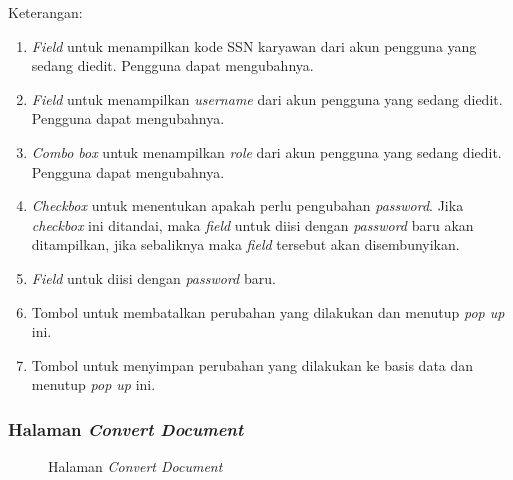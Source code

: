 Keterangan:
\begin{enumerate}
	\item \textit{Field} untuk menampilkan kode SSN karyawan dari akun pengguna yang sedang diedit. Pengguna dapat mengubahnya.
	\item \textit{Field} untuk menampilkan \textit{username} dari akun pengguna yang sedang diedit. Pengguna dapat mengubahnya.
	\item \textit{Combo box} untuk menampilkan \textit{role} dari akun pengguna yang sedang diedit. Pengguna dapat mengubahnya.
	\item \textit{Checkbox} untuk menentukan apakah perlu pengubahan \textit{password}. Jika \textit{checkbox} ini ditandai, maka \textit{field} untuk diisi dengan \textit{password} baru akan ditampilkan, jika sebaliknya maka \textit{field} tersebut akan disembunyikan.
	\item \textit{Field} untuk diisi dengan \textit{password} baru.
	\item Tombol untuk membatalkan perubahan yang dilakukan dan menutup \textit{pop up} ini. 
	\item Tombol untuk menyimpan perubahan yang dilakukan ke basis data dan menutup \textit{pop up} ini. 
\end{enumerate}


\subsubsection{Halaman \textit{Convert Document}}
\label{sec:page6}

\begin{figure}[H]
	\centering
	\caption{Halaman \textit{Convert Document}}
	\label{fig:page6}
\end{figure}	

